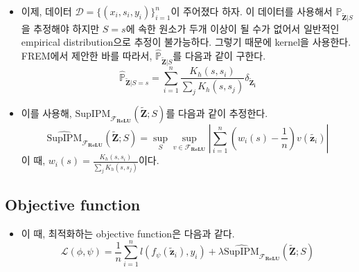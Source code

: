 \documentclass[10pt]{article}
\begin{document}
\begin{itemize}
\begin{equation*}
\begin{aligned}
        &=\sup_{S} \sup_{v \in  \mathcal{F}_{\mathbf{ReLU}}} | \int v(\tilde{\mathbf{z}}) (d\mathbb{P}_{\tilde{\mathbf{Z}} |S}(\tilde{\mathbf{z}}) - d\mathbb{P}_{\tilde{\mathbf{Z}}}(\tilde{\mathbf{z}})) |
    \end{aligned}
    \end{equation*}
    \item 이제, 데이터 $\mathcal{D} = \{(x_i, s_i, y_i)\}_{i=1}^{n}$이 주어졌다 하자. 이 데이터를 사용해서 $\mathbb{P}_{\tilde{\mathbf{Z}} |S} $을 추정해야 하지만 $S=s$에 속한 원소가 두개 이상이 될 수가 없어서 일반적인 empirical distribution으로 추정이 불가능하다. 그렇기 때문에 kernel을 사용한다. FREM에서 제안한 바를 따라서, $\widehat{\mathbb{P}}_{\tilde{\mathbf{Z}} |S} $를 다음과 같이 구한다.
    \begin{equation*}
        \widehat{\mathbb{P}}_{\tilde{\mathbf{Z}} |S=s} = \sum_{i=1}^{n} \frac{K_{h}(s, s_i)}{\sum_{j} K_{h}(s,s_j)} \delta_{\mathbf{\tilde{Z}_{i}}} 
    \end{equation*}
    \item 이를 사용해, $\mathrm{SupIPM}_{\mathcal{F}_{\mathbf{ReLU}}} (\mathbf{\tilde{Z}} ; S)$를 다음과 같이 추정한다.
    \begin{equation*}
        \widehat{\mathrm{SupIPM}}_{\mathcal{F}_{\mathbf{ReLU}}} (\mathbf{\tilde{Z}} ; S)  =  \sup_{S} \sup_{v \in  \mathcal{F}_{\mathbf{ReLU}}} |\sum_{i=1}^{n} \left(w_i(s) - \frac{1}{n} \right) v(\tilde{\mathbf{z}_i}) |
    \end{equation*}
    이 때, $w_i(s) =  \frac{K_{h}(s, s_i)}{\sum_{j} K_{h}(s,s_j)}$이다.
\end{itemize}

\subsection{Objective function}
\begin{itemize}
    \item 이 때, 최적화하는 objective function은 다음과 같다.
    \begin{equation*}
        \mathcal{L}(\phi, \psi) = \frac{1}{n} \sum_{i=1}^{n} l(f_\psi(\tilde{\mathbf{z}}_i), y_i) + \lambda \widehat{\mathrm{SupIPM}}_{\mathcal{F}_{\mathbf{ReLU}}} (\mathbf{\tilde{Z}} ; S) 
    \end{equation*}
\end{itemize}
\end{document}

